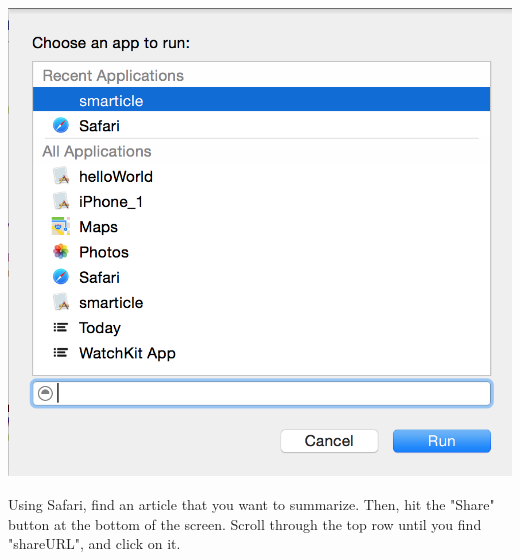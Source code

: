 \documentclass[11pt, margin=1in]{article}
\begin{document}
\begin{center}
\includegraphics[scale=0.5]{9.jpg}
\end{center}   

Using Safari, find an article that you want to summarize.  Then, hit the "Share" button at the bottom of the screen.  Scroll through the top row until you find "shareURL", and click on it.   
  
\end{document}
